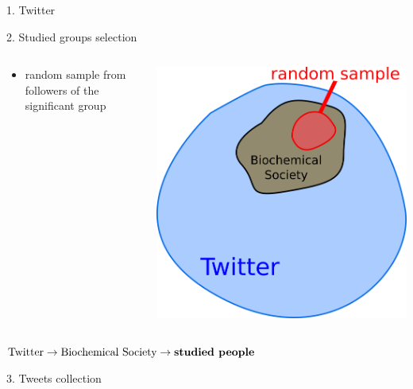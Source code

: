 \documentclass{beamer}
\begin{document}
\begin{frame}[fragile]
\begin{columns}[T]
\begin{column}{.33\textwidth}
\begin{blankblock}{1. Twitter}
\end{blankblock}
\begin{blankblock}{2. Studied groups selection}
    \begin{columns}
        \begin{column}{.6\textwidth}
            \begin{itemize}
                \item random sample from followers of the significant group
            \end{itemize}
        \end{column}
        \begin{column}{.4\textwidth}
            \center
            \includegraphics[scale=0.45]{./Pics/sets.png}
        \end{column}
    \end{columns}
    \center
    $\text{Twitter} \rightarrow \text{Biochemical Society} \rightarrow \text{\textbf{studied people}}$
\end{blankblock}
\begin{blankblock}{3. Tweets collection}
    \begin{columns}
    	\begin{itemize}

\end{itemize}
\end{columns}
\end{blankblock}
\end{column}
\end{columns}
\end{frame}
\end{document}
